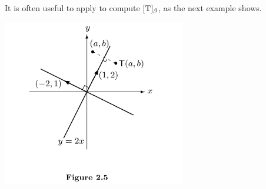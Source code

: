 \begin{note}
It is often useful to apply  to compute \([\mathrm{T}]_{\beta}\), as the next example shows.
\end{note}

\includegraphics[width=8cm]{images/figure-2-5.png}

